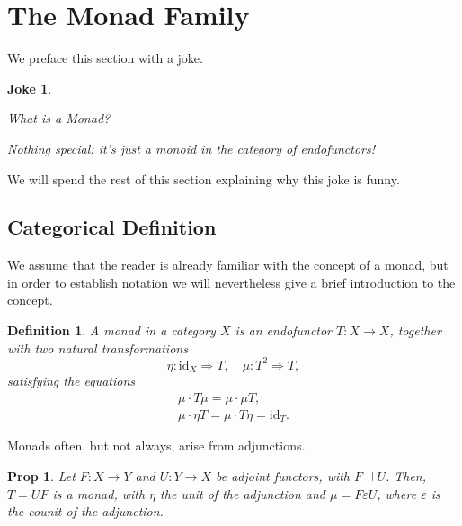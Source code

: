 \documentclass[11	pt]{article}
\newtheorem{prop}{Prop}
\newtheorem{definition}{Definition}
\newtheorem{joke}{Joke}
\theoremstyle{nonumberplain}
\newcommand{\id}{\mathrm{id}}
\newcommand{\nto}{\Rightarrow}
\begin{document}
\section{The Monad Family}\label{sec:monads}

We preface this section with a joke.

\begin{joke}
\leavevmode
\begin{description}[labelindent=\parindent]
\item[Novice learning Haskell:] What is a Monad?

\item[Haskell expert:] Nothing special: it's just a monoid in the category of endofunctors!
\end{description}
\end{joke}

We will spend the rest of this section explaining why this joke is funny.

\subsection{Categorical Definition}

We assume that the reader is already familiar with the concept of a monad, but in order to establish notation we will nevertheless give a brief introduction to the concept.

\begin{definition}
A monad in a category $X$ is an endofunctor $T \colon X \to X$, together with two natural transformations
\begin{equation}
\eta \colon \id_X \nto T, \quad \mu \colon T^2 \nto T,
\end{equation}
satisfying the equations
\begin{gather}
\mu \cdot T\mu = \mu \cdot \mu T,\\
\mu \cdot \eta T = \mu \cdot T \eta = \id_T.
\end{gather}
\end{definition}

Monads often, but not always, arise from adjunctions.

\begin{prop}
Let $F \colon X \to Y$ and $U \colon Y \to X$ be adjoint functors, with $F \dashv U$. Then, $T = UF$ is a monad, with $\eta$ the unit of the adjunction and $\mu = F \varepsilon U$, where $\varepsilon$ is the counit of the adjunction.
\end{prop}
\end{document}
